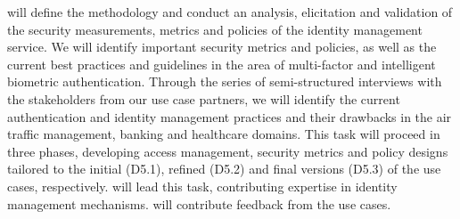 \begin{Workpackage}{\thewpno}
\begin{WPDescription}
\end{WPDescription}

\begin{Task}
\TaskResults{%
\ref{del:auth1},
\ref{del:auth3},
\ref{del:auth4}
}
\TaskHeader{}

\theTask{} will define the methodology and conduct an analysis, elicitation and validation of the security measurements, metrics and policies of the identity management service. 
We will identify important security metrics and policies, as well as the current best practices and guidelines in the area of multi-factor and intelligent biometric authentication. Through the series of semi-structured interviews with the stakeholders from our use case partners, we will identify the current authentication and identity management practices and their drawbacks in the air traffic management, banking and healthcare domains. This task will proceed in three phases, developing access management, security metrics and policy designs tailored to the initial (D5.1), refined (D5.2) and final versions (D5.3) of the use cases, respectively.  \COGNIshort{} will lead this task, contributing expertise in identity management mechanisms. \SOPRAshort{} will contribute feedback from the use cases.
  

\end{Task}
\end{Workpackage}
